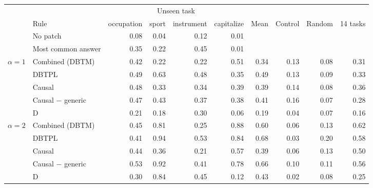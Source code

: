 \begin{tabular}{@{}llrrrrrrrr@{}}
\toprule
 & & \multicolumn{4}{c}{Unseen task} & & & & \\
\cmidrule(lr){3-6}
& Rule & occupation & sport & instrument & capitalize & Mean & Control & Random & 14 tasks \\
\midrule
 & No patch & 0.08 & 0.04 & 0.12 & 0.01 & & & & \\
 & Most common answer & 0.35 & 0.22 & 0.45 & 0.01 & & & & \\
\midrule
$\alpha=1$ & Combined (DBTM) & 0.42 & 0.22 & 0.22 & 0.51 & 0.34 & 0.13 & 0.08 & 0.31 \\
 & DBTPL & 0.49 & 0.63 & 0.48 & 0.35 & 0.49 & 0.13 & 0.09 & 0.33 \\
 & Causal & 0.48 & 0.33 & 0.34 & 0.39 & 0.39 & 0.14 & 0.08 & 0.36 \\
 & Causal $-$ generic & 0.47 & 0.43 & 0.37 & 0.38 & 0.41 & 0.16 & 0.07 & 0.28 \\
 & D & 0.21 & 0.18 & 0.30 & 0.06 & 0.19 & 0.04 & 0.07 & 0.16 \\
\midrule
$\alpha=2$ & Combined (DBTM) & 0.45 & 0.81 & 0.25 & 0.88 & 0.60 & 0.06 & 0.13 & 0.62 \\
 & DBTPL & 0.41 & 0.94 & 0.53 & 0.84 & 0.68 & 0.03 & 0.20 & 0.58 \\
 & Causal & 0.44 & 0.36 & 0.21 & 0.57 & 0.39 & 0.06 & 0.13 & 0.50 \\
 & Causal $-$ generic & 0.53 & 0.92 & 0.41 & 0.78 & 0.66 & 0.10 & 0.11 & 0.56 \\
 & D & 0.30 & 0.84 & 0.45 & 0.12 & 0.43 & 0.02 & 0.08 & 0.25 \\
\bottomrule
\end{tabular}
